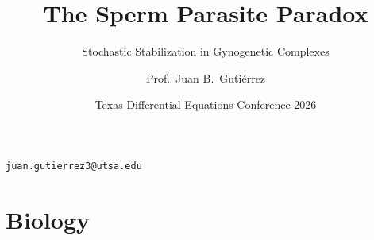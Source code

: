 \documentclass{beamer}
\title{The Sperm Parasite Paradox}
\subtitle{Stochastic Stabilization in Gynogenetic Complexes}
\author{Prof.\ Juan B.\ Gutiérrez}
\institute[UTSA]{\textsc{The University of Texas at San Antonio}}
\date{\footnotesize Texas Differential Equations Conference 2026}
\begin{document}
\begin{frame}
  \titlepage
  \vspace{-0.4cm}
  \begin{center}
    \footnotesize \texttt{juan.gutierrez3@utsa.edu}
  \end{center}
\end{frame}

\section{Biology}

\end{document}
